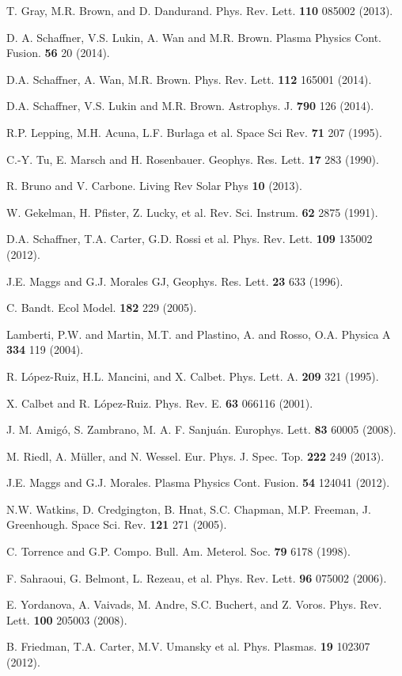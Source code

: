 \documentclass[aps,prx,twocolumn,secnumarabic,nobalancelastpage,amsmath,amssymb,
nofootinbib]{revtex4-1}
\begin{document}
\begin{thebibliography}{99}
T. Gray, M.R. Brown, and D. Dandurand. Phys. Rev. Lett. {\bf 110} 085002 (2013).

D. A. Schaffner, V.S. Lukin, A. Wan and M.R. Brown. Plasma Physics Cont. Fusion. {\bf 56} 20 (2014).

D.A. Schaffner, A. Wan, M.R. Brown. Phys. Rev. Lett. {\bf 112} 165001 (2014).

D.A. Schaffner, V.S. Lukin and M.R. Brown. Astrophys. J. {\bf 790} 126 (2014).

R.P. Lepping, M.H. Acuna, L.F. Burlaga et al. Space Sci Rev. {\bf 71} 207 (1995).

C.-Y. Tu, E. Marsch and H. Rosenbauer. Geophys. Res. Lett. {\bf 17} 283 (1990).

R. Bruno and V. Carbone. Living Rev Solar Phys {\bf 10} (2013).

W. Gekelman, H. Pfister, Z. Lucky, et al. Rev. Sci. Instrum. {\bf 62} 2875 (1991).

D.A. Schaffner, T.A. Carter, G.D. Rossi et al. Phys. Rev. Lett. {\bf 109} 135002 (2012).

J.E. Maggs and G.J. Morales GJ, Geophys. Res. Lett. {\bf 23} 633 (1996).

C. Bandt. Ecol Model. {\bf 182} 229 (2005).

Lamberti, P.W. and Martin, M.T. and Plastino, A. and Rosso, O.A. Physica A {\bf 334} 119 (2004).

R. L{\'o}pez-Ruiz, H.L. Mancini, and X. Calbet. Phys. Lett. A. {\bf 209} 321 (1995).

X. Calbet and R.  L{\'o}pez-Ruiz. Phys. Rev. E. {\bf 63} 066116 (2001).

J. M. Amig{\'o}, S. Zambrano, M. A. F. Sanju{\'a}n. Europhys. Lett. {\bf 83} 60005 (2008).

M. Riedl, A. M{\"u}ller, and N. Wessel. Eur. Phys. J. Spec. Top. {\bf 222} 249 (2013).

J.E. Maggs and G.J. Morales. Plasma Physics Cont. Fusion. {\bf 54} 124041 (2012).

N.W. Watkins, D. Credgington, B. Hnat, S.C. Chapman, M.P. Freeman, J. Greenhough. Space Sci. Rev. {\bf 121} 271 (2005).

C. Torrence and G.P. Compo. Bull. Am. Meterol. Soc. {\bf 79} 6178 (1998).

F. Sahraoui, G. Belmont, L. Rezeau, et al. Phys. Rev. Lett. {\bf 96} 075002 (2006).

E. Yordanova, A. Vaivads, M. Andre, S.C. Buchert, and Z. Voros. Phys. Rev. Lett. {\bf 100} 205003 (2008).

B. Friedman, T.A. Carter, M.V. Umansky et al. Phys. Plasmas. {\bf 19} 102307 (2012).

\end{thebibliography}
\end{document}
